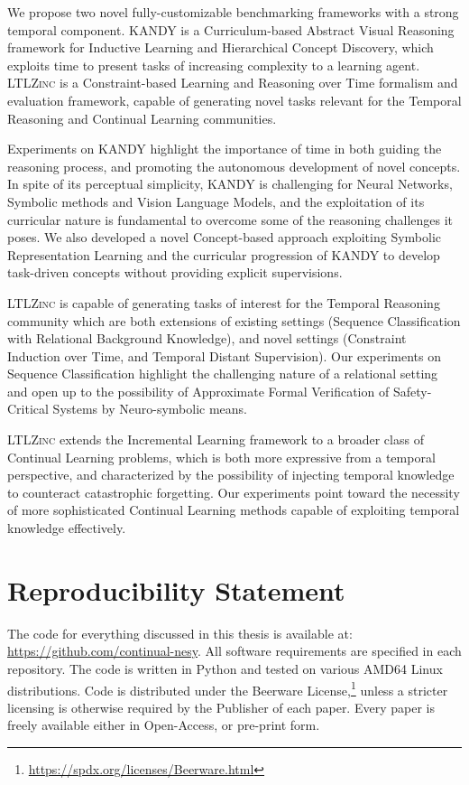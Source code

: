 \documentclass[a4paper,twoside,openright]{book}
\theoremstyle{plain}
\theoremstyle{definition}
\begin{document}
We propose two novel fully-customizable benchmarking frameworks with a strong temporal component. \textsc{KANDY} is a Curriculum-based Abstract Visual Reasoning framework for Inductive Learning and Hierarchical Concept Discovery, which exploits time to present tasks of increasing complexity to a learning agent.
\textsc{LTLZinc} is a Constraint-based Learning and Reasoning over Time formalism and evaluation framework, capable of generating novel tasks relevant for the Temporal Reasoning and Continual Learning communities.

Experiments on \textsc{KANDY} highlight the importance of time in both guiding the reasoning process, and promoting the autonomous development of novel concepts. In spite of its perceptual simplicity, \textsc{KANDY} is challenging for Neural Networks, Symbolic methods and Vision Language Models, and the exploitation of its curricular nature is fundamental to overcome some of the reasoning challenges it poses. We also developed a novel Concept-based approach exploiting Symbolic Representation Learning and the curricular progression of \textsc{KANDY} to develop task-driven concepts without providing explicit supervisions.

\textsc{LTLZinc} is capable of generating tasks of interest for the Temporal Reasoning community which are both extensions of existing settings (Sequence Classification with Relational Background Knowledge), and novel settings (Constraint Induction over Time, and Temporal Distant Supervision). Our experiments on Sequence Classification highlight the challenging nature of a relational setting and open up to the possibility of Approximate Formal Verification of Safety-Critical Systems by Neuro-symbolic means.

\textsc{LTLZinc} extends the Incremental Learning framework to a broader class of Continual Learning problems, which is both more expressive from a temporal perspective, and characterized by the possibility of injecting temporal knowledge to counteract catastrophic forgetting. Our experiments point toward the necessity of more sophisticated Continual Learning methods capable of exploiting temporal knowledge effectively.


\chapter{Reproducibility Statement}
The code for everything discussed in this thesis is available at: \url{https://github.com/continual-nesy}.
All software requirements are specified in each repository. The code is written in Python and tested on various AMD64 Linux distributions. Code is distributed under the Beerware License,\footnote{\url{https://spdx.org/licenses/Beerware.html}} unless a stricter licensing is otherwise required by the Publisher of each paper.
Every paper is freely available either in Open-Access, or pre-print form.
\end{document}
